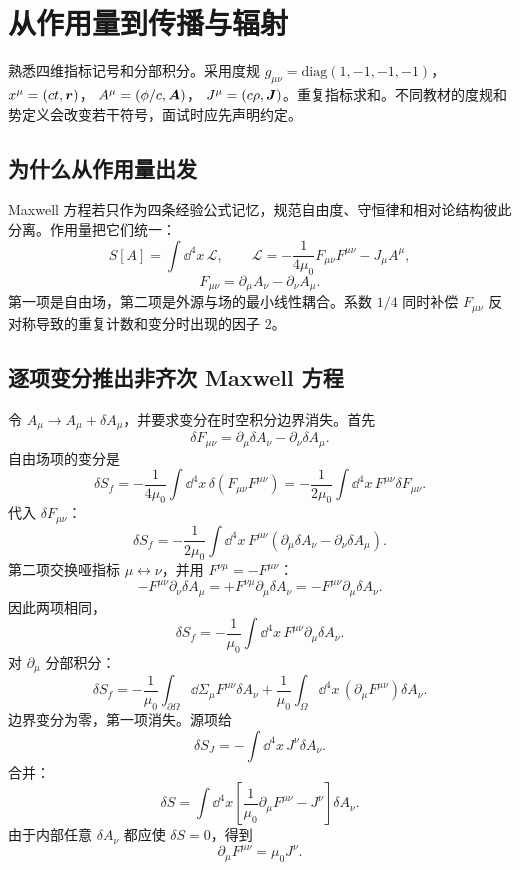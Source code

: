 \chapter{从作用量到传播与辐射}

\begin{prereqbox}
熟悉四维指标记号和分部积分。采用度规
$g_{\mu\nu}=\mathrm{diag}(1,-1,-1,-1)$，
$x^\mu=(ct,\bm{r})$，
$A^\mu=(\phi/c,\bm{A})$，
$J^\mu=(c\rho,\bm{J})$。重复指标求和。不同教材的度规和势定义会改变若干符号，面试时应先声明约定。
\end{prereqbox}

\section{为什么从作用量出发}
Maxwell 方程若只作为四条经验公式记忆，规范自由度、守恒律和相对论结构彼此分离。作用量把它们统一：
\[
S[A]=\int\dd^4x\,\mathcal L,\qquad
\mathcal L=-\frac1{4\mu_0}F_{\mu\nu}F^{\mu\nu}-J_\mu A^\mu,
\]
\[
F_{\mu\nu}=\partial_\mu A_\nu-\partial_\nu A_\mu.
\]
第一项是自由场，第二项是外源与场的最小线性耦合。系数 $1/4$ 同时补偿
$F_{\mu\nu}$ 反对称导致的重复计数和变分时出现的因子 $2$。

\section{逐项变分推出非齐次 Maxwell 方程}
令 $A_\mu\to A_\mu+\delta A_\mu$，并要求变分在时空积分边界消失。首先
\[
\delta F_{\mu\nu}
=\partial_\mu\delta A_\nu-\partial_\nu\delta A_\mu.
\]
自由场项的变分是
\[
\delta S_f=-\frac1{4\mu_0}\int\dd^4x\,
\delta(F_{\mu\nu}F^{\mu\nu})
=-\frac1{2\mu_0}\int\dd^4x\,F^{\mu\nu}\delta F_{\mu\nu}.
\]
代入 $\delta F_{\mu\nu}$：
\[
\delta S_f=-\frac1{2\mu_0}\int\dd^4x\,
F^{\mu\nu}(\partial_\mu\delta A_\nu-\partial_\nu\delta A_\mu).
\]
第二项交换哑指标 $\mu\leftrightarrow\nu$，并用
$F^{\nu\mu}=-F^{\mu\nu}$：
\[
-F^{\mu\nu}\partial_\nu\delta A_\mu
=+F^{\nu\mu}\partial_\mu\delta A_\nu
=-F^{\mu\nu}\partial_\mu\delta A_\nu.
\]
因此两项相同，
\[
\delta S_f=-\frac1{\mu_0}\int\dd^4x\,
F^{\mu\nu}\partial_\mu\delta A_\nu.
\]
对 $\partial_\mu$ 分部积分：
\[
\delta S_f=
-\frac1{\mu_0}\int_{\partial\Omega}\dd\Sigma_\mu
F^{\mu\nu}\delta A_\nu
+\frac1{\mu_0}\int_\Omega\dd^4x\,
(\partial_\mu F^{\mu\nu})\delta A_\nu.
\]
边界变分为零，第一项消失。源项给
\[
\delta S_J=-\int\dd^4x\,J^\nu\delta A_\nu.
\]
合并：
\[
\delta S=\int\dd^4x\left[
\frac1{\mu_0}\partial_\mu F^{\mu\nu}-J^\nu
\right]\delta A_\nu.
\]
由于内部任意 $\delta A_\nu$ 都应使 $\delta S=0$，得到
\[
\boxed{\partial_\mu F^{\mu\nu}=\mu_0J^\nu}.
\]

